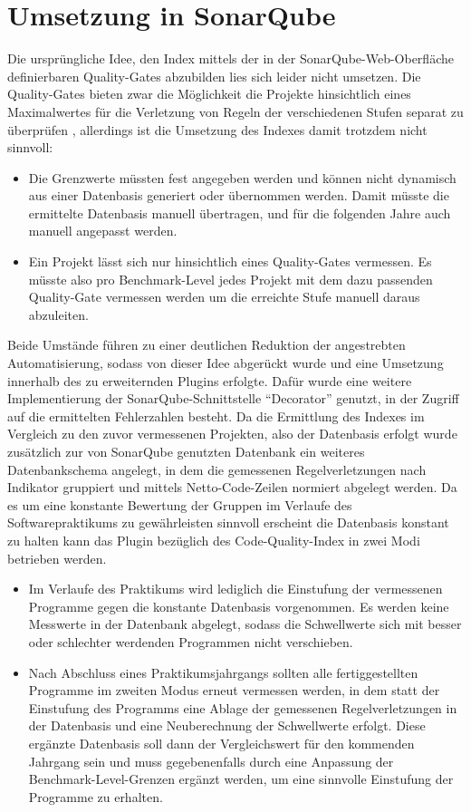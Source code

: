 \documentclass[da,ngerman]{stthesis}
\begin{document}
		\section{Umsetzung in SonarQube}
			Die ursprüngliche Idee, den Index mittels der in der SonarQube-Web-Oberfläche definierbaren Quality-Gates abzubilden lies sich leider nicht umsetzen. Die Quality-Gates bieten zwar die Möglichkeit die Projekte hinsichtlich eines Maximalwertes für die Verletzung von Regeln der verschiedenen Stufen separat zu überprüfen \cite{QualityGates}, allerdings ist die Umsetzung des Indexes damit trotzdem nicht sinnvoll:
			\begin{itemize}
				\item Die Grenzwerte müssten fest angegeben werden und können nicht dynamisch aus einer Datenbasis generiert oder übernommen werden. Damit müsste die ermittelte Datenbasis manuell übertragen, und für die folgenden Jahre auch manuell angepasst werden.
				\item Ein Projekt lässt sich nur hinsichtlich eines Quality-Gates vermessen. Es müsste also pro Benchmark-Level jedes Projekt mit dem dazu passenden Quality-Gate vermessen werden um die erreichte Stufe manuell daraus abzuleiten.
			\end{itemize}
			Beide Umstände führen zu einer deutlichen Reduktion der angestrebten Automatisierung, sodass von dieser Idee abgerückt wurde und eine Umsetzung innerhalb des zu erweiternden Plugins erfolgte. Dafür wurde eine weitere Implementierung der SonarQube-Schnittstelle "`Decorator"' genutzt, in der Zugriff auf die ermittelten Fehlerzahlen besteht. \newline
			Da die Ermittlung des Indexes im Vergleich zu den zuvor vermessenen Projekten, also der Datenbasis erfolgt wurde zusätzlich zur von SonarQube genutzten Datenbank ein weiteres Datenbankschema angelegt, in dem die gemessenen Regelverletzungen nach Indikator gruppiert und mittels Netto-Code-Zeilen normiert abgelegt werden. Da es um eine konstante Bewertung der Gruppen im Verlaufe des Softwarepraktikums zu gewährleisten sinnvoll erscheint die Datenbasis konstant zu halten kann das Plugin bezüglich des Code-Quality-Index in zwei Modi betrieben werden. 
			\begin{itemize}
				\item Im Verlaufe des Praktikums wird lediglich die Einstufung der vermessenen Programme gegen die konstante Datenbasis vorgenommen. Es werden keine Messwerte in der Datenbank abgelegt, sodass die Schwellwerte sich mit besser oder schlechter werdenden Programmen nicht verschieben.
				\item Nach Abschluss eines Praktikumsjahrgangs sollten alle fertiggestellten Programme im zweiten Modus erneut vermessen werden, in dem statt der Einstufung des Programms eine Ablage der gemessenen Regelverletzungen in der Datenbasis und eine Neuberechnung der Schwellwerte erfolgt. Diese ergänzte Datenbasis soll dann der Vergleichswert für den kommenden Jahrgang sein und muss gegebenenfalls durch eine Anpassung der Benchmark-Level-Grenzen ergänzt werden, um eine sinnvolle Einstufung der Programme zu erhalten.	
			\end{itemize}	
			
\end{document}
